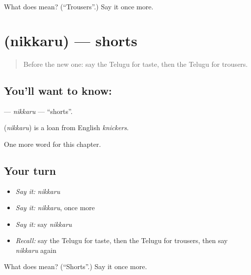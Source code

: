 \begin{tcolorbox}[breakable,colback=teal!4,colframe=teal!35!black,title={Before you move on}]
What does  mean? (\textquotedblleft{}Trousers\textquotedblright{}.) Say it once more.
\end{tcolorbox}
\section[\texorpdfstring{\te{నిక్కరు} (nikkaru)}{నిక్కరు (nikkaru)}]{ (nikkaru) — shorts}

\label{lesson:TE-C263-nikkaru}



\begin{quote}
Before the new one: say the Telugu for taste, then the Telugu for trousers.
\end{quote}

\subsection*{You'll want to know: }
\textbf{} — \emph{nikkaru} — \textquotedblleft{}shorts\textquotedblright{}.

\begin{cousinweb}
\textbf{} (\emph{nikkaru}) is a loan from English \emph{knickers}.
\end{cousinweb}

\begin{grammarlens}[title={What you've built}]
One more word for this chapter.
\end{grammarlens}

\subsection*{Your turn}
\begin{itemize}
\raggedright
  \item \emph{Say it:} \emph{nikkaru}
  \item \emph{Say it:} \emph{nikkaru}, once more
  \item \emph{Say it:} say \emph{nikkaru}
  \item \emph{Recall:} say the Telugu for taste, then the Telugu for trousers, then say \emph{nikkaru} again
\end{itemize}

\begin{tcolorbox}[breakable,colback=teal!4,colframe=teal!35!black,title={Before you move on}]
What does  mean? (\textquotedblleft{}Shorts\textquotedblright{}.) Say it once more.
\end{tcolorbox}
